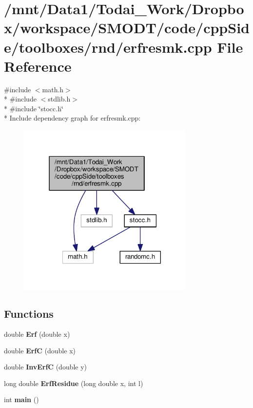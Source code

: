 \section{/mnt/\-Data1/\-Todai\-\_\-\-Work/\-Dropbox/workspace/\-S\-M\-O\-D\-T/code/cpp\-Side/toolboxes/rnd/erfresmk.cpp File Reference}
\label{toolboxes_2rnd_2erfresmk_8cpp}
{\ttfamily \#include $<$math.\-h$>$}\\*
{\ttfamily \#include $<$stdlib.\-h$>$}\\*
{\ttfamily \#include \char`\"{}stocc.\-h\char`\"{}}\\*
Include dependency graph for erfresmk.\-cpp\-:\nopagebreak
\begin{figure}[H]
\begin{center}
\leavevmode
\includegraphics[width=250pt]{toolboxes_2rnd_2erfresmk_8cpp__incl}
\end{center}
\end{figure}
\subsection*{Functions}
\begin{DoxyCompactItemize}
\item 
double {\bf Erf} (double x)
\item 
double {\bf Erf\-C} (double x)
\item 
double {\bf Inv\-Erf\-C} (double y)
\item 
long double {\bf Erf\-Residue} (long double x, int l)
\item 
int {\bf main} ()
\end{DoxyCompactItemize}
